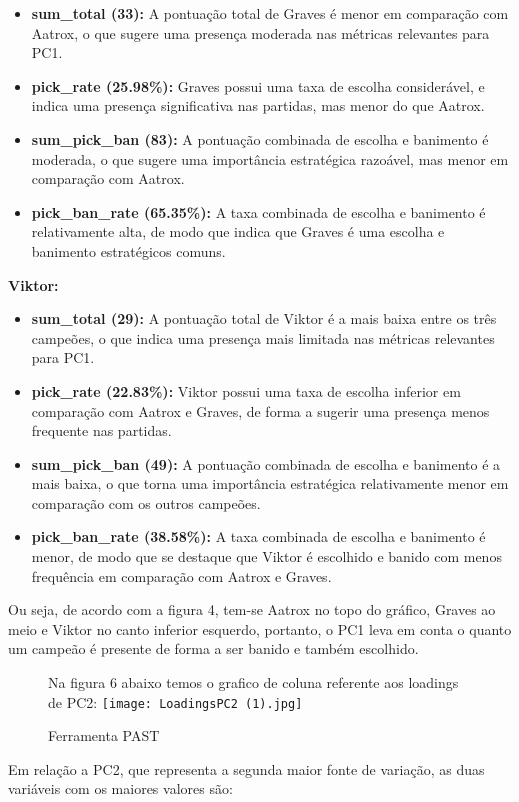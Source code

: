 \documentclass[a4paper,12pt]{article}
\begin{document}
\begin{itemize}
  \item \textbf{sum\_total (33):} A pontuação total de Graves é menor em comparação com Aatrox, o que sugere uma presença moderada nas métricas relevantes para PC1.
  \item \textbf{pick\_rate (25.98\%):} Graves possui uma taxa de escolha considerável, e indica uma presença significativa nas partidas, mas menor do que Aatrox.
  \item \textbf{sum\_pick\_ban (83):} A pontuação combinada de escolha e banimento é moderada, o que sugere uma importância estratégica razoável, mas menor em comparação com Aatrox.
  \item \textbf{pick\_ban\_rate (65.35\%):} A taxa combinada de escolha e banimento é relativamente alta, de modo que indica que Graves é uma escolha e banimento estratégicos comuns.
\end{itemize}

\begin{flushleft}
\textbf{Viktor:}
\end{flushleft}

\begin{itemize}
  \item \textbf{sum\_total (29):} A pontuação total de Viktor é a mais baixa entre os três campeões, o que indica uma presença mais limitada nas métricas relevantes para PC1.
  \item \textbf{pick\_rate (22.83\%):} Viktor possui uma taxa de escolha inferior em comparação com Aatrox e Graves, de forma a sugerir uma presença menos frequente nas partidas.
  \item \textbf{sum\_pick\_ban (49):} A pontuação combinada de escolha e banimento é a mais baixa, o que torna uma importância estratégica relativamente menor em comparação com os outros campeões.
  \item \textbf{pick\_ban\_rate (38.58\%):} A taxa combinada de escolha e banimento é menor, de modo que se destaque que Viktor é escolhido e banido com menos frequência em comparação com Aatrox e Graves.
\end{itemize}

Ou seja, de acordo com a figura 4, tem-se Aatrox no topo do gráfico, Graves ao meio e Viktor no canto inferior esquerdo, portanto, o PC1 leva em conta o quanto um campeão é presente de forma a ser banido e também escolhido.


\begin{figure}[h]
Na figura 6 abaixo temos o grafico de coluna referente aos loadings de PC2:
    \centering
    \texttt{[image: LoadingsPC2 (1).jpg]}
    \caption{Ferramenta PAST}
    \label{fig:enter-label}
\end{figure}
\pagebreak
Em relação a PC2, que representa a segunda maior fonte de variação, as duas variáveis com os maiores valores são:\\
\end{document}
